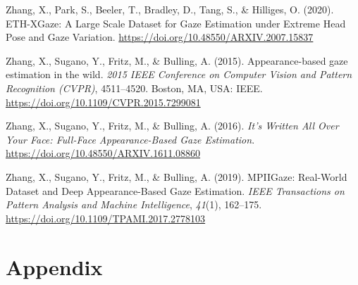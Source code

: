 \documentclass[
  man,floatsintext]{apa6}
\newlength{\cslhangindent}
\newenvironment{CSLReferences}[2] %
 {\begin{list}{}{%
  \setlength{\itemindent}{0pt}
  \setlength{\leftmargin}{0pt}
  \setlength{\parsep}{0pt}
  \ifodd #1
   \setlength{\leftmargin}{\cslhangindent}
   \setlength{\itemindent}{-1\cslhangindent}
  \fi
  \setlength{\itemsep}{#2\baselineskip}}}
 {\end{list}}
\begin{document}
\begin{CSLReferences}{1}{0}
Zhang, X., Park, S., Beeler, T., Bradley, D., Tang, S., \& Hilliges, O. (2020). {ETH-XGaze}: {A Large Scale Dataset} for {Gaze Estimation} under {Extreme Head Pose} and {Gaze Variation}. \url{https://doi.org/10.48550/ARXIV.2007.15837}

Zhang, X., Sugano, Y., Fritz, M., \& Bulling, A. (2015). Appearance-based gaze estimation in the wild. \emph{2015 {IEEE Conference} on {Computer Vision} and {Pattern Recognition} ({CVPR})}, 4511--4520. Boston, MA, USA: IEEE. \url{https://doi.org/10.1109/CVPR.2015.7299081}

Zhang, X., Sugano, Y., Fritz, M., \& Bulling, A. (2016). \emph{It's {Written All Over Your Face}: {Full-Face Appearance-Based Gaze Estimation}}. \url{https://doi.org/10.48550/ARXIV.1611.08860}

Zhang, X., Sugano, Y., Fritz, M., \& Bulling, A. (2019). {MPIIGaze}: {Real-World Dataset} and {Deep Appearance-Based Gaze Estimation}. \emph{IEEE Transactions on Pattern Analysis and Machine Intelligence}, \emph{41}(1), 162--175. \url{https://doi.org/10.1109/TPAMI.2017.2778103}

\end{CSLReferences}

\endgroup

\newpage

\section{Appendix}\label{appendix}
\end{document}
